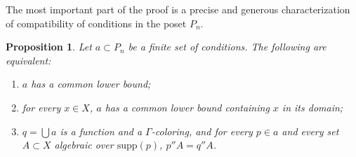 \documentclass{article}
\newcommand{\supp}{\mathrm{supp}}
\newtheorem{proposition}[theorem]{Proposition}
\theoremstyle{definition}
\begin{document}
\noindent The most important part of the proof is a precise and generous characterization of compatibility of conditions in the poset $P_n$. 


\begin{proposition}
\label{compatibilityproposition}
Let $a\subset P_n$ be a finite set of conditions. The following are equivalent:

\begin{enumerate}
\item $a$ has a common lower bound;
\item for every $x\in X$, $a$ has a common lower bound containing $x$ in its domain;
\item $q=\bigcup a$ is a function and a $\Gamma$-coloring, and for every $p\in a$ and every set $A\subset X$ algebraic over $\supp(p)$, $p''A=q''A$.
\end{enumerate}
\end{proposition}
\end{document}
